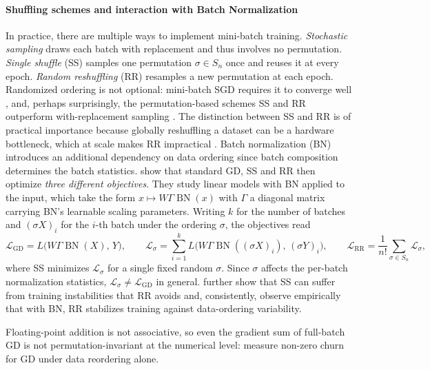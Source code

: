 \documentclass[mathematics,review,submit,moreauthors]{Definitions/mdpi}
\begin{document}
\paragraph{Shuffling schemes and interaction with Batch Normalization}
In practice, there are multiple ways to implement mini-batch training.
\emph{Stochastic sampling} draws each batch with replacement and thus involves no permutation.
\emph{Single shuffle} (SS) samples one permutation $\sigma\in S_n$ once and reuses it at every epoch.
\emph{Random reshuffling} (RR) resamples a new permutation at each epoch.
Randomized ordering is not optional: mini-batch SGD requires it to converge well \citep{xu2024vj}, and, perhaps surprisingly, the permutation-based schemes SS and RR outperform with-replacement sampling \citep{koloskova2024p4icml}.
The distinction between SS and RR is of practical importance because globally reshuffling a dataset can be a hardware bottleneck, which at scale makes RR impractical \citep{nguyen20222iipdpsi,koloskova2024p4icml,xu2024vj}.
Batch normalization (BN) introduces an additional dependency on data ordering since batch composition determines the batch statistics.
\citet{wu2023p4icml} show that standard GD, SS and RR then optimize \emph{three different objectives}.
They study linear models with BN applied to the input, which take the form $x \mapsto W\Gamma\operatorname{BN}(x)$ with $\Gamma$ a diagonal matrix carrying BN's learnable scaling parameters.
Writing $k$ for the number of batches and $(\sigma X)_i$ for the $i$-th batch under the ordering $\sigma$, the objectives read
$$
\mathcal{L}_{\mathrm{GD}} = L\big(W\Gamma\operatorname{BN}(X),\, Y\big), \qquad
\mathcal{L}_{\sigma} = \sum_{i=1}^{k} L\big(W\Gamma\operatorname{BN}((\sigma X)_i),\, (\sigma Y)_i\big), \qquad
\mathcal{L}_{\mathrm{RR}} = \frac{1}{n!}\sum_{\sigma\in S_n} \mathcal{L}_{\sigma},
$$
where SS minimizes $\mathcal{L}_\sigma$ for a single fixed random $\sigma$.
Since $\sigma$ affects the per-batch normalization statistics, $\mathcal{L}_\sigma \neq \mathcal{L}_{\mathrm{GD}}$ in general.
\citet{wu2023p4icml} further show that SS can suffer from training instabilities that RR avoids and, consistently, \citet{zhuang2022pmls} observe empirically that with BN, RR stabilizes training against data-ordering variability.

\begin{Remark}
    Floating-point addition is not associative, so even the gradient sum of full-batch GD is not permutation-invariant at the numerical level: \citet{zhuang2022pmls} measure non-zero churn for GD under data reordering alone.
\end{Remark}
\end{document}
